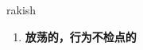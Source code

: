 
\begin{frame}
{\huge rakish}
\begin{center}
\begin{enumerate}\Large
  \item \textbf{放荡的，行为不检点的}
\end{enumerate}
\end{center}
\end{frame}
